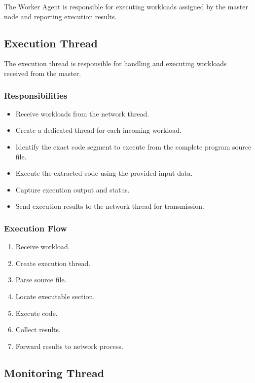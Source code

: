 \documentclass[12pt,a4paper]{article}
\begin{document}
The Worker Agent is responsible for executing workloads assigned by the master node and reporting execution results.

\subsection{Execution Thread}

The execution thread is responsible for handling and executing workloads received from the master.

\subsubsection{Responsibilities}

\begin{itemize}
    \item Receive workloads from the network thread.
    \item Create a dedicated thread for each incoming workload.
    \item Identify the exact code segment to execute from the complete program source file.
    \item Execute the extracted code using the provided input data.
    \item Capture execution output and status.
    \item Send execution results to the network thread for transmission.
\end{itemize}

\subsubsection{Execution Flow}

\begin{enumerate}
    \item Receive workload.
    \item Create execution thread.
    \item Parse source file.
    \item Locate executable section.
    \item Execute code.
    \item Collect results.
    \item Forward results to network process.
\end{enumerate}

\subsection{Monitoring Thread}
\end{document}

